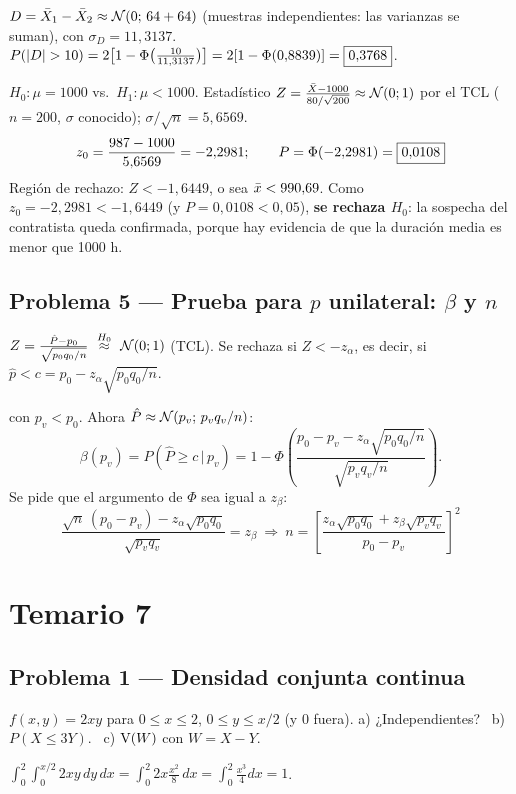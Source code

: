  $D=\bar{X}_1-\bar{X}_2\approx\mathcal{N}(0;\,64+64)$ (muestras independientes: las varianzas se suman), con $\sigma_D=11{,}3137$.
$P(|D|>10)=2\big[1-\Phi\big(\frac{10}{11{,}3137}\big)\big]=2[1-\Phi(0{,}8839)]=\res{0{,}3768}$.

$H_0:\mu=1000$ vs.\ $H_1:\mu<1000$. Estadístico $Z=\frac{\bar{X}-1000}{80/\sqrt{200}}\approx\mathcal{N}(0;1)$ por el TCL ($n=200$, $\sigma$ conocido); $\sigma/\sqrt n=5{,}6569$.
\[
z_0=\frac{987-1000}{5{,}6569}=-2{,}2981;\qquad P=\Phi(-2{,}2981)=\boxed{0{,}0108}
\]
Región de rechazo: $Z<-1{,}6449$, o sea $\bar{x}<990{,}69$. Como $z_0=-2{,}2981<-1{,}6449$ (y $P=0{,}0108<0{,}05$), \textbf{se rechaza $H_0$}: la sospecha del contratista queda confirmada, porque hay evidencia de que la duración media es menor que 1000 h.

\subsection{Problema 5 --- Prueba para $p$ unilateral: $\beta$ y $n$}
 $Z=\frac{\hat P-p_0}{\sqrt{p_0q_0/n}}\ \overset{H_0}{\approx}\ \Nor(0;1)$ (TCL). Se rechaza si $Z<-z_\alpha$, es decir, si $\hat p<c=p_0-z_\alpha\sqrt{p_0q_0/n}$.

 con $p_v<p_0$. Ahora $\hat P\approx\mathcal{N}(p_v;\,p_vq_v/n)$:
\[
\beta(p_v)=P(\hat P\ge c\,|\,p_v)=1-\Phi\left(\frac{p_0-p_v-z_\alpha\sqrt{p_0q_0/n}}{\sqrt{p_vq_v/n}}\right).
\]
 Se pide que el argumento de $\Phi$ sea igual a $z_\beta$:
\[
\frac{\sqrt n\,(p_0-p_v)-z_\alpha\sqrt{p_0q_0}}{\sqrt{p_vq_v}}=z_\beta\ \Rightarrow\ \boxed{n=\left[\frac{z_\alpha\sqrt{p_0q_0}+z_\beta\sqrt{p_vq_v}}{p_0-p_v}\right]^2}
\]

\newpage
\section{Temario 7}

\subsection{Problema 1 --- Densidad conjunta continua}
\begin{enun}
$f(x,y)=2xy$ para $0\le x\le2$, $0\le y\le x/2$ (y 0 fuera). a) ¿Independientes? \ b) $P(X\le3Y)$. \ c) $\mathrm{V}(W)$ con $W=X-Y$.
\end{enun}
 $\int_0^2\!\int_0^{x/2}2xy\,dy\,dx=\int_0^2 2x\frac{x^2}{8}\,dx=\int_0^2\frac{x^3}{4}dx=1$. \checkmark


